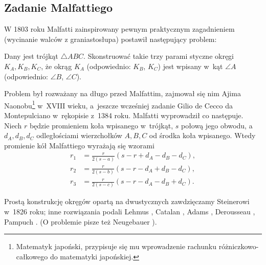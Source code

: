 %

\subsection{Zadanie Malfattiego}
\label{}
W 1803 roku Malfatti \cite{malfatti_1803} zainspirowany pewnym praktycznym zagadnieniem (wycinanie walców z graniastosłupa) postawił następujący problem:
%

\begin{problem}
	\label{malfatti_problem}
%
	Dany jest trójkąt $\triangle ABC$.
	Skonstruować takie trzy parami styczne okręgi $K_A, K_B, K_C$, że okrąg $K_A$ (odpowiednio: $K_B$, $K_C$) jest wpisany w~kąt $\angle A$ (odpowiednio: $\angle B$, $\angle C$).
\end{problem}

Problem był rozważany na długo przed Malfattim, zajmował się nim Ajima Naonobu\footnote{Matematyk japoński, przypisuje się mu wprowadzenie rachunku różniczkowo-całkowego do matematyki japońskiej.} w~XVIII wieku, a~jeszcze wcześniej zadanie Gilio de Cecco da Montepulciano w~rękopisie z~1384 roku.
%
%
Malfatti wyprowadził co następuje.
Niech $r$ będzie promieniem koła wpisanego w~trójkąt, $s$ połową jego obwodu, a~$d_A, d_B, d_C$ odległościami wierzchołków $A, B, C$ od środka koła wpisanego.
Wtedy promienie kół Malfattiego wyrażają się wzorami
\begin{align}
	r_1 & = {\frac {r}{2(s-a)}}(s-r+d_A-d_B-d_C), \\
	r_2 & = {\frac {r}{2(s-b)}}(s-r-d_A+d_B-d_C), \\
	r_3 & = {\frac {r}{2(s-c)}}(s-r-d_A-d_B+d_C).
\end{align}

Prostą konstrukcję okręgów opartą na dwustycznych zawdzięczamy Steinerowi \cite{steiner_1826} w~1826 roku;
%
inne rozwiązania podali Lehmus \cite{lehmus_1819}, Catalan \cite{catalan_1846}, Adams \cite{adams_1846}, Derousseau \cite{derousseau_1895}, Pampuch \cite{pampuch_1904}.
(O problemie pisze też Neugebauer \cite[s. 102]{neugebauer_2018}).


